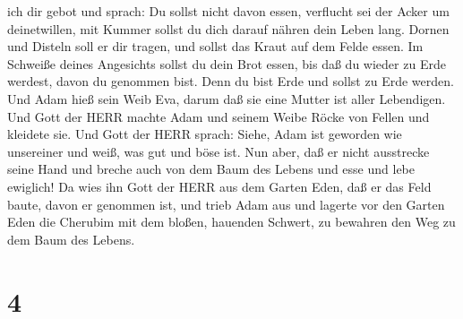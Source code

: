 ich dir gebot und sprach: Du sollst nicht davon essen, verflucht sei der
Acker um deinetwillen, mit Kummer sollst du dich darauf nähren dein
Leben lang.  Dornen und Disteln soll er dir tragen, und
sollst das Kraut auf dem Felde essen.  Im Schweiße deines
Angesichts sollst du dein Brot essen, bis daß du wieder zu Erde werdest,
davon du genommen bist. Denn du bist Erde und sollst zu Erde werden.
 Und Adam hieß sein Weib Eva, darum daß sie eine Mutter ist
aller Lebendigen.  Und Gott der HERR machte Adam und seinem
Weibe Röcke von Fellen und kleidete sie.  Und Gott der HERR
sprach: Siehe, Adam ist geworden wie unsereiner und weiß, was gut und
böse ist. Nun aber, daß er nicht ausstrecke seine Hand und breche auch
von dem Baum des Lebens und esse und lebe ewiglich!  Da
wies ihn Gott der HERR aus dem Garten Eden, daß er das Feld baute, davon
er genommen ist,  und trieb Adam aus und lagerte vor den
Garten Eden die Cherubim mit dem bloßen, hauenden Schwert, zu bewahren
den Weg zu dem Baum des Lebens.

\hypertarget{section-3}{%
\section{4}\label{section-3}}

